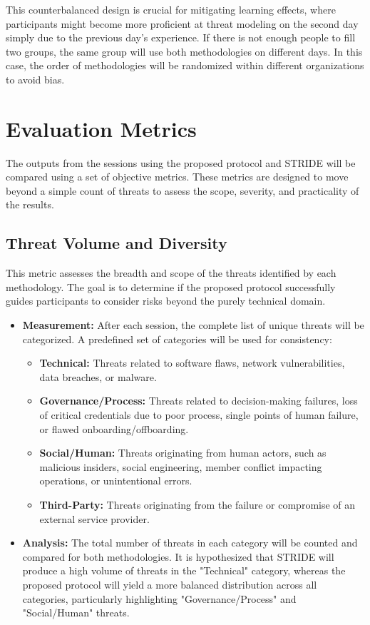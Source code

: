This counterbalanced design is crucial for mitigating learning effects, where
participants might become more proficient at threat modeling on the second day
simply due to the previous day's experience. If there is not enough people to
fill two groups, the same group will use both methodologies on different days.
In this case, the order of methodologies will be randomized within different
organizations to avoid bias.

\section{Evaluation Metrics}
\label{sec:evaluation_metrics}

The outputs from the sessions using the proposed protocol and STRIDE will be
compared using a set of objective metrics. These metrics are designed to move
beyond a simple count of threats to assess the scope, severity, and practicality
of the results.

\subsection{Threat Volume and Diversity}
\label{subsec:threat_volume_and_diversity}

This metric assesses the breadth and scope of the threats identified by each
methodology. The goal is to determine if the proposed protocol successfully
guides participants to consider risks beyond the purely technical domain.

\begin{itemize}
\item \textbf{Measurement:} After each session, the complete list of unique
threats will be categorized. A predefined set of categories will be used for
consistency:
\begin{itemize}
\item \textbf{Technical:} Threats related to software flaws, network
vulnerabilities, data breaches, or malware.
\item \textbf{Governance/Process:} Threats related to decision-making failures,
loss of critical credentials due to poor process, single points of human
failure, or flawed onboarding/offboarding.
\item \textbf{Social/Human:} Threats originating from human actors, such as
malicious insiders, social engineering, member conflict impacting operations, or
unintentional errors.
\item \textbf{Third-Party:} Threats originating from the failure or compromise
of an external service provider.
\end{itemize}
\item \textbf{Analysis:} The total number of threats in each category will be
counted and compared for both methodologies. It is hypothesized that STRIDE will
produce a high volume of threats in the "Technical" category, whereas the
proposed protocol will yield a more balanced distribution across all categories,
particularly highlighting "Governance/Process" and "Social/Human" threats.
\end{itemize}


